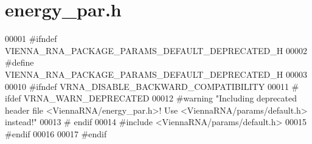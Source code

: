 \hypertarget{energy__par_8h_source}{}\section{energy\+\_\+par.\+h}
\label{energy__par_8h_source}

\begin{DoxyCode}
00001 \textcolor{preprocessor}{#ifndef VIENNA\_RNA\_PACKAGE\_PARAMS\_DEFAULT\_DEPRECATED\_H}
00002 \textcolor{preprocessor}{#define VIENNA\_RNA\_PACKAGE\_PARAMS\_DEFAULT\_DEPRECATED\_H}
00003 
00010 \textcolor{preprocessor}{#ifndef VRNA\_DISABLE\_BACKWARD\_COMPATIBILITY}
00011 \textcolor{preprocessor}{# ifdef VRNA\_WARN\_DEPRECATED}
00012 \textcolor{preprocessor}{#warning "Including deprecated header file <ViennaRNA/energy\_par.h>! Use <ViennaRNA/params/default.h>
       instead!"}
00013 \textcolor{preprocessor}{# endif}
00014 \textcolor{preprocessor}{#include <ViennaRNA/params/default.h>}
00015 \textcolor{preprocessor}{#endif}
00016 
00017 \textcolor{preprocessor}{#endif}
\end{DoxyCode}
